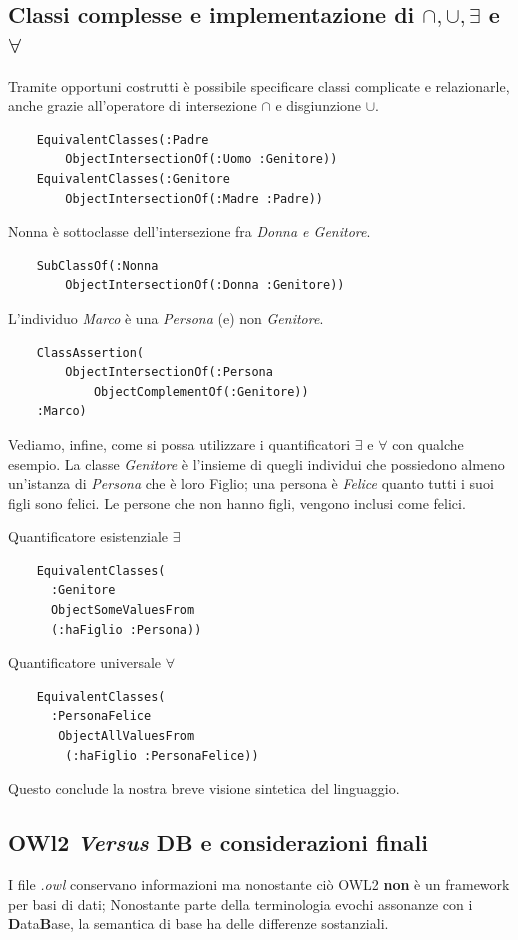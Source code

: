 \subsection{Classi complesse e implementazione di $ \cap,\cup,\exists $ e $ \forall $}
Tramite opportuni costrutti è possibile specificare classi complicate e relazionarle, 
anche grazie all'operatore di intersezione $\cap$ e disgiunzione $ \cup $.
\begin{verbatim}
	EquivalentClasses(:Padre
		ObjectIntersectionOf(:Uomo :Genitore))
	EquivalentClasses(:Genitore
		ObjectIntersectionOf(:Madre :Padre))
\end{verbatim}
Nonna è sottoclasse dell'intersezione fra \textit{Donna e Genitore}.
\begin{verbatim}
	SubClassOf(:Nonna 
		ObjectIntersectionOf(:Donna :Genitore))
\end{verbatim}
L'individuo \textit{Marco} è una \textit{Persona} (e) non \textit{Genitore}.
\begin{verbatim}
	ClassAssertion(
		ObjectIntersectionOf(:Persona 
			ObjectComplementOf(:Genitore))
	:Marco)
\end{verbatim}
Vediamo, infine, come si possa utilizzare i quantificatori $ \exists $ e $ \forall $ con qualche esempio.
La classe \textit{Genitore} è l'insieme di quegli individui che possiedono almeno un'istanza 
di \textit{Persona} che è loro Figlio; una persona è \textit{Felice} quanto tutti 
i suoi figli sono felici. Le persone che non hanno figli, vengono inclusi come felici.
\begin{multicols}{2}
	Quantificatore esistenziale $ \exists $
	\begin{verbatim}
	EquivalentClasses(
	  :Genitore
	  ObjectSomeValuesFrom
	  (:haFiglio :Persona))
	\end{verbatim}
	
	Quantificatore universale $ \forall $
	\begin{verbatim}
	EquivalentClasses(
	  :PersonaFelice
	   ObjectAllValuesFrom
	    (:haFiglio :PersonaFelice))
	\end{verbatim}
\end{multicols}

Questo conclude la nostra breve visione sintetica del linguaggio.

\subsection{OWl2 \emph{Versus} DB e considerazioni finali}
I file \textit{.owl} conservano informazioni ma nonostante ciò OWL2 \textbf{non} è un framework
per basi di dati; Nonostante parte della terminologia evochi assonanze con i \textbf{D}ata\textbf{B}ase, 
la semantica di base ha delle differenze sostanziali.

